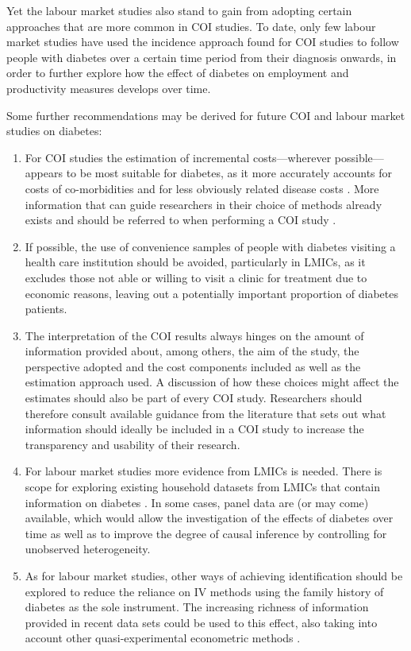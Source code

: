 Yet the labour market studies also stand to gain from adopting certain approaches that are more common in \ac{COI} studies. To date, only few labour market studies have used the incidence approach found for \ac{COI} studies to follow people with diabetes over a certain time period from their diagnosis onwards, in order to further explore how the effect of diabetes on employment and productivity measures develops over time.

Some further recommendations may be derived for future \ac{COI} and labour market studies on diabetes: 
\begin{enumerate}


\item	For \ac{COI} studies the estimation of incremental costs---wherever possible---appears to be most suitable for diabetes, as it more accurately accounts for costs of co-morbidities  and for less obviously related disease costs \parencite{Honeycutt2009a,Tunceli2010c}. More information that can guide researchers in their choice of methods already exists and should be referred to when performing a \ac{COI} study \parencite{Akobundu2006}.

\item	If possible, the use of convenience samples of people with diabetes visiting a health care institution should be avoided, particularly in \acp{LMIC}, as it excludes those not able or willing to visit a clinic for treatment due to economic reasons, leaving out a potentially important proportion of diabetes patients.

\item	The interpretation of the \ac{COI} results always hinges on the amount of information provided about, among others, the aim of the study, the perspective adopted and the cost components included as well as the estimation approach used. A discussion of how these choices might affect the estimates should also be part of every \ac{COI} study. Researchers should therefore consult available guidance from the literature that sets out what information should ideally be included in a \ac{COI} study \parencite{Larg2011} to increase the transparency and usability of their research. 

\item	For labour market studies more evidence from \acp{LMIC} is needed. There is scope for exploring existing household datasets from \acp{LMIC} that contain information on diabetes \parencite{Seuring2014}. In some cases, panel data are (or may come) available, which would allow the investigation of the effects of diabetes over time as well as to improve the degree of causal inference by controlling for unobserved heterogeneity.

\item	As for labour market studies, other ways of achieving identification should be explored to reduce the reliance on \ac{IV} methods using the family history of diabetes as the sole instrument. The increasing richness of information provided in recent data sets could be used to this effect, also taking into account other quasi-experimental econometric methods \parencite{Craig2012}.
\end{enumerate}

